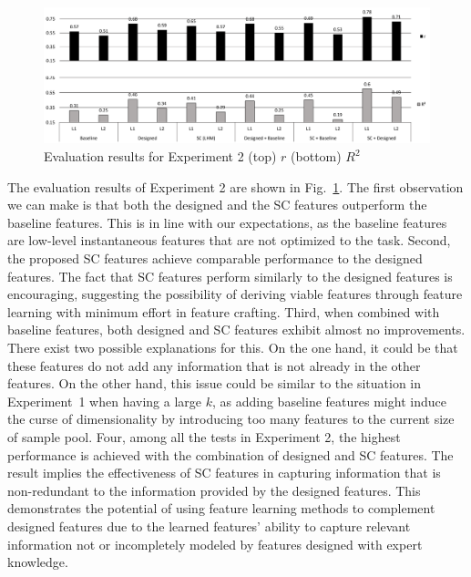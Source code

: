 \documentclass{ws-ijsc}
\begin{document}

\begin{figure}
\centering
\includegraphics[width = \linewidth]{./figs/exp2_remake.pdf}
\caption{Evaluation results for Experiment 2 (top) $r$ (bottom) $R^{2}$}
\label{fig:exp2}
\end{figure}




The evaluation results of Experiment 2 are shown in Fig.~\ref{fig:exp2}. The first observation we can make is that both the designed and the SC features outperform the baseline features. This is in line with our expectations, as the baseline features are low-level instantaneous features that are not optimized to the task. %
Second, the proposed SC features achieve comparable performance to the designed features. The fact that SC features perform similarly to the designed features is encouraging, suggesting the possibility of deriving viable features through feature learning with minimum effort in feature crafting. 
Third, when combined with baseline features, both designed and SC features exhibit almost no improvements. There exist two possible explanations for this. On the one hand, it could be that these features do not add any information that is not already in the other features. On the other hand, this issue could be similar to the situation in Experiment~1 when having a large $k$, as adding baseline features might induce the curse of dimensionality by introducing too many features to the current size of sample pool. %
Four, among all the tests in Experiment 2, the highest performance is achieved with the combination of designed and SC features. The result implies the effectiveness of SC features in capturing information that is non-redundant to the information provided by the designed features.
This demonstrates the potential of using feature learning methods to complement designed features due to the learned features' ability to capture relevant information not or incompletely modeled by features designed with expert knowledge.
\end{document}
